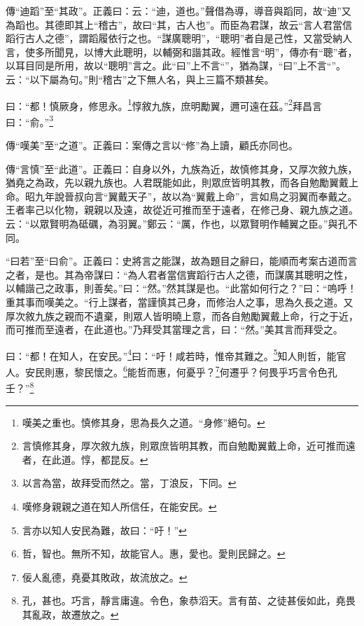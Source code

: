 {\noindent\zhuan{}\fzbyks 傳“迪蹈”至“其政”。正義曰：云：“迪，道也。”聲借為導，導音與蹈同，故“迪”又為蹈也。其德即其上“稽古”，故曰“其，古人也”。而臣為君謀，故云“言人君當信蹈行古人之德”，謂蹈履依行之也。“謀廣聰明”，“聰明”者自是己性，又當受納人言，使多所聞見，以博大此聰明，以輔弼和諧其政。經惟言“明”，傳亦有“聰”者，以耳目同是所用，故以“聰明”言之。此“曰”上不言“”，猶為謀，“曰”上不言“”。云：“以下屬為句。”則“稽古”之下無人名，與上三篇不類甚矣。 \par}

曰：“都！慎厥身，修思永。\footnote{嘆美之重也。慎修其身，思為長久之道。“身修”絕句。}惇敘九族，庶明勵翼，邇可遠在茲。”\footnote{言慎修其身，厚次敘九族，則眾庶皆明其教，而自勉勵翼戴上命，近可推而遠者，在此道。惇，都昆反。}拜昌言曰：“俞。”\footnote{以言為當，故拜受而然之。當，丁浪反，下同。}

{\noindent\zhuan{}\fzbyks 傳“嘆美”至“之道”。正義曰：案傳之言以“修”為上讀，顧氏亦同也。 \par}

{\noindent\zhuan{}\fzbyks 傳“言慎”至“此道”。正義曰：自身以外，九族為近，故慎修其身，又厚次敘九族，猶堯之為政，先以親九族也。人君既能如此，則眾庶皆明其教，而各自勉勵翼戴上命。昭九年說晉叔向言“翼戴天子”，故以為“翼戴上命”，言如鳥之羽翼而奉戴之。王者率己以化物，親親以及遠，故從近可推而至于遠者，在修己身、親九族之道。云：“以眾賢明為砥礪，為羽翼。”鄭云：“厲，作也，以眾賢明作輔翼之臣。”與孔不同。 \par}

{\noindent\shu{}\fzkt “曰若”至“曰俞”。正義曰：史將言之能謀，故為題目之辭曰，能順而考案古道而言之者，是也。其為帝謀曰：“為人君者當信實蹈行古人之德，而謀廣其聰明之性，以輔諧己之政事，則善矣。”曰：“然。”然其謀是也。“此當如何行之？”曰：“嗚呼！重其事而嘆美之。“行上謀者，當謹慎其己身，而修治人之事，思為久長之道。又厚次敘九族之親而不遺棄，則眾人皆明曉上意，而各自勉勵翼戴上命，行之于近，而可推而至遠者，在此道也。”乃拜受其當理之言，曰：“然。”美其言而拜受之。 \par}

曰：“都！在知人，在安民。”\footnote{嘆修身親親之道在知人所信任，在能安民。}曰：“吁！咸若時，惟帝其難之。\footnote{言亦以知人安民為難，故曰：“吁！”}知人則哲，能官人。安民則惠，黎民懷之。\footnote{哲，智也。無所不知，故能官人。惠，愛也。愛則民歸之。}能哲而惠，何憂乎？\footnote{佞人亂德，堯憂其敗政，故流放之。}何遷乎？何畏乎巧言令色孔壬？”\footnote{孔，甚也。巧言，靜言庸違。令色，象恭滔天。言有苗、之徒甚佞如此，堯畏其亂政，故遷放之。}


